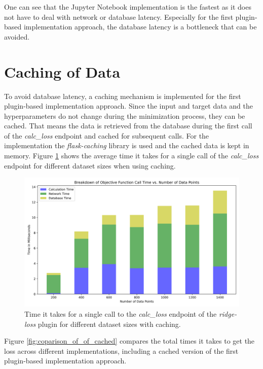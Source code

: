 \documentclass[
  a4paper,  %
  twoside,  %
  bibliography=totoc,
  headsepline,
  cleardoublepage=empty,
  parskip=half,
  draft=false
]{scrbook}
\begin{document}
One can see that the Jupyter Notebook implementation is the fastest as it does not have to deal with network or database latency.
Especially for the first plugin-based implementation approach, the database latency is a bottleneck that can be avoided.

\section{Caching of Data}
\label{subsec:cachingOfData}

To avoid database latency, a caching mechanism is implemented for the first plugin-based implementation approach.
Since the input and target data and the hyperparameters do not change during the minimization process, they can be cached.
That means the data is retrieved from the database during the first call of the \emph{calc\_loss} endpoint and cached for subsequent calls.
For the implementation the \emph{flask-caching} library is used and the cached data is kept in memory.
Figure \ref{fig:of_call_time_version1_cached} shows the average time it takes for a single call of the \emph{calc\_loss} endpoint for different dataset sizes when using caching.

\begin{figure}
  \centering
  \includegraphics[width=\textwidth]{graphics/of_call_times_version1_cached.png}
  \caption{Time it takes for a single call to the \emph{calc\_loss} endpoint of the \emph{ridge-loss} plugin for different dataset sizes with caching.}
  \label{fig:of_call_time_version1_cached}
\end{figure}

Figure \ref{fig:coparison_of_of_cached} compares the total times it takes to get the loss across different implementations, including a cached version of the first plugin-based implementation approach.
\end{document}
